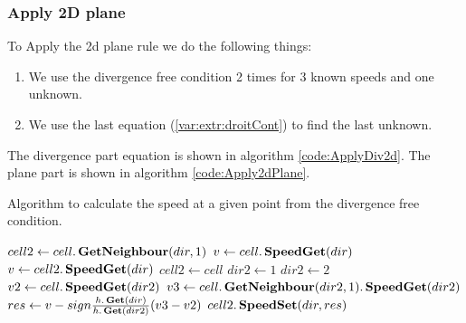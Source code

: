 \subsubsection{Apply 2D plane}


To Apply the 2d plane rule we do the following things:
\begin{enumerate}
\item We use the divergence free condition 2 times for 3 known speeds and one unknown.
\item We use the last equation (\ref{var:extr:droitCont}) to find the last unknown.
\end{enumerate}
The divergence part equation is shown in algorithm \ref{code:ApplyDiv2d}.
The plane part is shown in algorithm \ref{code:Apply2dPlane}.

\begin{algorithm}
\caption{Algorithm to calculate the speed at a given point from the divergence free condition.}
\label{code:ApplyDiv2d}
\begin{algorithmic}[1]
 
	\State $cell2\gets cell.\mathop{\textbf{GetNeighbour}}(dir,1)$ 
	\State $v \gets cell.\mathop{\textbf{SpeedGet}}(dir)$ 
	  
	\State $v \gets cell2.\mathop{\textbf{SpeedGet}}(dir)$
	\State $cell2 \gets cell$
	\EndIf
	\State $dir2 \gets 1$ 
	\State $dir2\gets 2$
	\EndIf
	\State $v2 \gets cell.\mathop{\textbf{SpeedGet}}(dir2)$ 
	\State $v3 \gets cell.\mathop{\textbf{GetNeighbour}}(dir2,1).\mathop{\textbf{SpeedGet}}(dir2)$ 
	\State $res \gets v-sign\frac{h.\mathop{\textbf{Get}}(dir)}{h.\mathop{\textbf{Get}}(dir2)}(v3-v2)$ 
	\State $cell2.\mathop{\textbf{SpeedSet}}(dir,res)$ 
\EndFunction
\end{algorithmic}
\end{algorithm}


